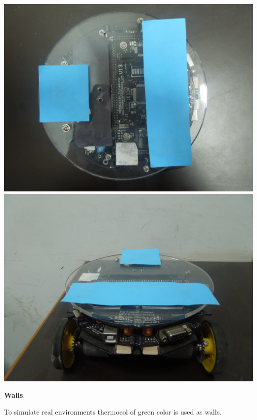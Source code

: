 \documentclass[report]{res}
\begin{document}
	\begin{center}
	\includegraphics[scale = 0.05]{graphics/pics/DSCN0039.jpg}
	\includegraphics[scale = 0.05]{graphics/pics/DSCN0040.jpg} \\
	\end{center}
	
	\pagebreak
	
	
	\textbf{Walls}:
	
	To simulate real environments thermocol of green color is used as walls.\\
	
\end{document}
